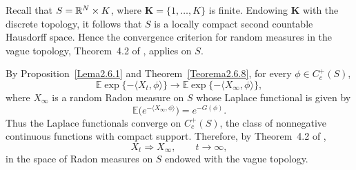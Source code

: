 \documentclass[reqno,final,11pt]{amsart}
\newcommand{\1}{\mathbbm{1}}
\renewcommand{\cite}{\citet}
\theoremstyle{plain}
\theoremstyle{definition}
\theoremstyle{remark}
\begin{document}
Recall that \(S=\mathbb{R}^N\times\mathbb \mathbf K\), where
\(\mathbf K=\{1,\ldots,K\}\) is finite. Endowing \(\mathbf K\) with the
discrete topology, it follows that \(S\) is a locally compact second
countable Hausdorff space. Hence the convergence criterion for random
measures in the vague topology, Theorem~4.2 of \cite{Olav}, applies on
\(S\).

By Proposition~\ref{Lema2.6.1} and Theorem~\ref{Teorema2.6.8}, for every \(\phi\in C_c^+(S)\),
\[
  \mathbb E\exp\{-\langle X_t,\phi\rangle\}
  \longrightarrow
  \mathbb E\exp\{-\langle X_\infty,\phi\rangle\},
\]
where \(X_\infty\) is a random Radon measure on \(S\) whose Laplace
functional is given by
\[
  \mathbb E\big(e^{-\langle X_\infty,\phi\rangle}\big)
  = e^{-G(\phi)}.
\]
Thus the Laplace functionals converge on \(C_c^+(S)\), the class of
nonnegative continuous functions with compact support. Therefore, by
Theorem~4.2 of \cite{Olav},
\[
  X_t \Rightarrow X_\infty, \qquad t\to\infty,
\]
in the space of Radon measures on \(S\) endowed with the vague topology.
\end{document}
